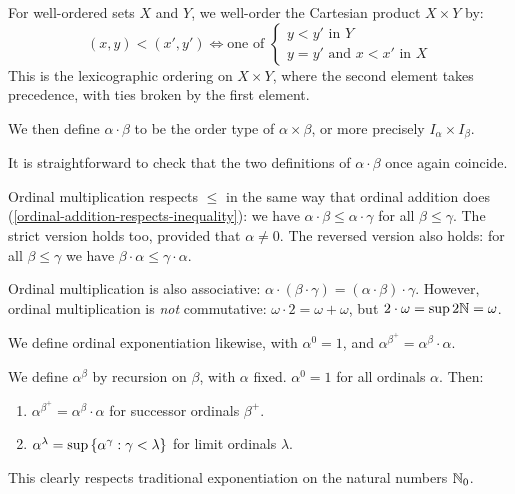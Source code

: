 \documentclass{article}
\begin{document}
\begin{definition}
    For well-ordered sets $X$ and $Y$, we well-order the Cartesian product $X \times Y$ by:
    \[
	(x, y) < (x', y') \iff \text{one of } \begin{cases}
		y < y' \text{ in } Y \\
		y = y' \text{ and } x < x' \text{ in } X
	\end{cases}
	\]
	This is the lexicographic ordering on $X \times Y$, where the second element takes precedence, with ties broken by the first element.
	
	We then define $\alpha \cdot \beta$ to be the order type of $\alpha \times \beta$, or more precisely $I_\alpha \times I_\beta$.
\end{definition}

\begin{corollary}
	It is straightforward to check that the two definitions of $\alpha \cdot \beta$ once again coincide.
\end{corollary}

\begin{corollary}
	Ordinal multiplication respects $\leq$ in the same way that ordinal addition does (\ref{ordinal-addition-respects-inequality}): we have $\alpha \cdot \beta \leq \alpha \cdot \gamma$ for all $\beta \leq \gamma$. The strict version holds too, provided that $\alpha \neq 0$. The reversed version also holds: for all $\beta \leq \gamma$ we have $\beta \cdot \alpha \leq \gamma \cdot \alpha$.
\end{corollary}

\begin{corollary}
	Ordinal multiplication is also associative: $\alpha \cdot (\beta \cdot \gamma) = (\alpha \cdot \beta) \cdot \gamma$. However, ordinal multiplication is \textit{not} commutative: $\omega \cdot 2 = \omega + \omega$, but $2 \cdot \omega = \sup 2\mathbb{N} = \omega$.
\end{corollary}

We define ordinal exponentiation likewise, with $\alpha^0 = 1$, and $\alpha^{\beta^+} = \alpha^\beta \cdot \alpha$.

\begin{definition}
    We define $\alpha^\beta$ by recursion on $\beta$, with $\alpha$ fixed. $\alpha^0 = 1$ for all ordinals $\alpha$. Then:
    \begin{enumerate}
    	\item $\alpha^{\beta^+} = \alpha^\beta \cdot \alpha$ for successor ordinals $\beta^+$.
    	\item $\alpha^\lambda = \sup \left\lbrace \alpha^\gamma : \gamma < \lambda \right\rbrace$ for limit ordinals $\lambda$.
	\end{enumerate}
	This clearly respects traditional exponentiation on the natural numbers $\mathbb{N}_0$.
\end{definition}
\end{document}
